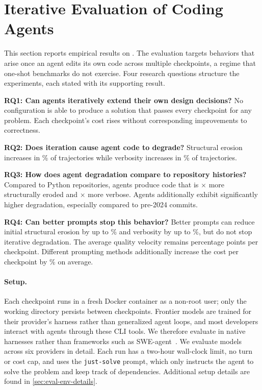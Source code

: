 \section{Iterative Evaluation of Coding Agents}\label{sec:results}

This section reports empirical results on \scb{}. The evaluation targets
behaviors that arise once an agent edits its own code across multiple
checkpoints, a regime that one-shot benchmarks do not exercise. Four
research questions structure the experiments, each stated with its
supporting result.

\noindent\textbf{RQ1: Can agents iteratively extend their own design decisions?} No configuration is able to produce a solution that passes every checkpoint for any problem. Each checkpoint's cost rises without corresponding improvements to correctness.

\noindent\textbf{RQ2: Does iteration cause agent code to degrade?} Structural erosion increases in \erosionPctIncreasing\% of trajectories while verbosity increases in \vfTrajIncPct\% of trajectories.

\noindent\textbf{RQ3: How does agent degradation compare to repository histories?} Compared to \avhPanelN{} Python repositories, agents produce code that is \avhAllErosionRatio{}$\times$ more structurally eroded and \avhAllVerbRatio{}$\times$ more verbose. Agents additionally exhibit significantly higher degradation, especially compared to pre-2024 commits.

\noindent\textbf{RQ4: Can better prompts stop this behavior?} Better prompts can reduce initial structural erosion by up to \psRqInitialEroReductionMax\% and verbosity by up to \psRqInitialVerbReductionMax\%, but do not stop iterative degradation. The average quality velocity remains \psRqQualityVelocityPp{} percentage points per checkpoint. Different prompting methods additionally increase the cost per checkpoint by \psRqCostIncreaseMean\% on average.


\paragraph{Setup.} 

Each checkpoint runs in a fresh Docker container as a non-root user; only the working directory persists between checkpoints. Frontier models are trained for their provider's harness rather than generalized agent loops, and most developers interact with agents through these CLI tools. We therefore evaluate in native harnesses rather than frameworks such as SWE-agent~\citep{swe-agent}. We evaluate \overallNumModels{} models across six providers in detail. Each run has a two-hour wall-clock limit, no turn or cost cap, and uses the \texttt{just-solve} prompt, which only instructs the agent to solve the problem and keep track of dependencies. Additional setup details are found in \autoref{sec:eval-env-details}.

